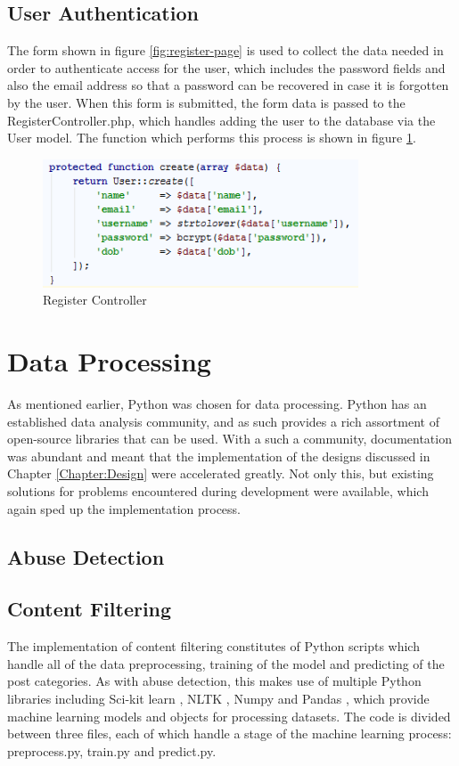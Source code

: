 \subsection{User Authentication}
The form shown in figure \ref{fig:register-page} is used to collect the data needed in order to authenticate access for the user, which includes the password fields and also the email address so that a password can be recovered in case it is forgotten by the user. When this form is submitted, the form data is passed to the RegisterController.php, which handles adding the user to the database via the User model. The function which performs this process is shown in figure \ref{fig:register-controller}.

\begin{figure}[H]
	\centering
	\includegraphics[height=1.5in]{Images/Implementation/register-controller}
	\caption{Register Controller} \label{fig:register-controller}
\end{figure}

\section{Data Processing}
As mentioned earlier, Python was chosen for data processing. Python has an established data analysis community, and as such provides a rich assortment of open-source libraries that can be used. With a such a community, documentation was abundant and meant that the implementation of the designs discussed in Chapter \ref{Chapter:Design} were accelerated greatly. Not only this, but existing solutions for problems encountered during development were available, which again sped up the implementation process. 

\subsection{Abuse Detection}
\subsection{Content Filtering}
The implementation of content filtering constitutes of Python scripts which handle all of the data preprocessing, training of the model and predicting of the post categories. As with abuse detection, this makes use of multiple Python libraries including Sci-kit learn \cite{scikit:home}, NLTK \cite{nltk}, Numpy \cite{Numpy} and Pandas \cite{Pandas}, which provide machine learning models and objects for processing datasets. The code is divided between three files, each of which handle a stage of the machine learning process: preprocess.py, train.py and predict.py.

